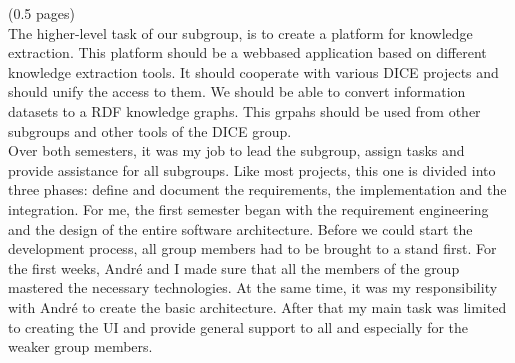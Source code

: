 (0.5 pages)\\

The higher-level task of our subgroup, is to create a platform for knowledge extraction. This platform should be a webbased application based on different knowledge extraction tools. It should cooperate with various DICE projects and should unify the access to them. We should be able to convert information datasets to a RDF knowledge graphs. This grpahs should be used from other subgroups and other tools of the DICE group.\\

Over both semesters, it was my job to lead the subgroup, assign tasks and provide assistance for all subgroups. Like most projects, this one is divided into three phases: define and document the requirements, the implementation and the integration. For me, the first semester began with the requirement engineering and the design of the entire software architecture. Before we could start the development process, all group members had to be brought to a stand first. For the first weeks, André and I made sure that all the members of the group mastered the necessary technologies. At the same time, it was my responsibility with André to create the basic architecture. After that my main task was limited to creating the UI and provide general support to all and especially for the weaker group members.
